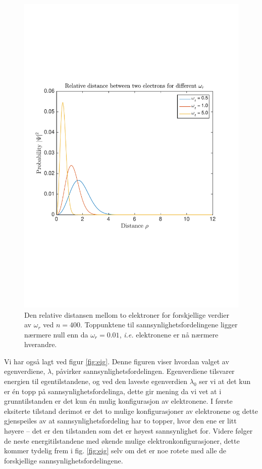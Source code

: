 \documentclass[norsk, 12pt]{article}
\theoremstyle{definition} \newtheorem{defi}{Definisjon}[subsection]
\theoremstyle{definition} \newtheorem{teo}{Teorem}[subsection]
\theoremstyle{definition} \newtheorem*{eks}{Eksempel}
\begin{document}
\begin{figure}[H]
\centering
\includegraphics[scale = 0.5, trim = 1cm 7cm 1cm 7cm]{omega_05_1_5.pdf}
\caption{Den relative distansen mellom to elektroner for forskjellige verdier av $\omega_r$ ved $n = 400$. Toppunktene til sannsynlighetsfordelingene ligger nærmere null enn da $\omega_r=0.01$, \emph{i.e.} elektronene er nå nærmere hverandre.}
\label{fig:n400}
\end{figure}


Vi har også lagt ved figur \ref{fig:eig}. Denne figuren viser hvordan valget av egenverdiene, $\lambda$, påvirker sannsynlighetsfordelingen. Egenverdiene tilsvarer energien til egentilstandene, og ved den laveste egenverdien $\lambda_0$ ser vi at det kun er én topp på sannsynlighetsfordelinga, dette gir mening da vi vet at i grunntilstanden er det kun én mulig konfigurasjon av elektronene. I første eksiterte tilstand derimot er det to mulige konfigurasjoner av elektronene og dette gjenspeiles av at sannsynlighetsfordeling har to topper, hvor den ene er litt høyere -- det er den tilstanden som det er høyest sannsynlighet for. Videre følger de neste energitilstandene med økende mulige elektronkonfigurasjoner, dette kommer tydelig frem i fig. \ref{fig:eig} selv om det er noe rotete med alle de forskjellige sannsynlighetsfordelingene. 
\end{document}
